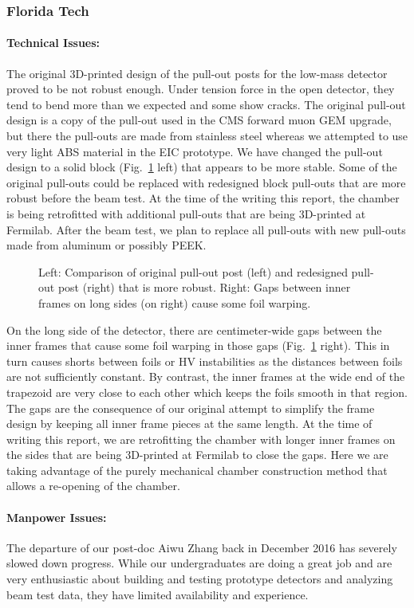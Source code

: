 \subsubsection{Florida Tech} 

\paragraph*{Technical Issues:} The original 3D-printed design of the pull-out posts for the low-mass detector proved to be not robust enough. Under tension force in the open detector, they tend to bend more than we expected and some show cracks. The original pull-out design is a copy of the pull-out used in the CMS forward muon GEM upgrade, but there the pull-outs are made from stainless steel whereas we attempted to use very light ABS material in the EIC prototype. We have changed the pull-out design to a solid block (Fig.~\ref{fig:Pullouts} left) that appears to be more stable. Some of the original pull-outs could be replaced with redesigned block pull-outs that are more robust before the beam test. At the time of the writing this report, the chamber is being retrofitted with additional pull-outs that are being 3D-printed at Fermilab. After the beam test, we plan to replace all pull-outs with new pull-outs made from aluminum or possibly PEEK.

\begin{figure}
	\centering
	\caption{\label{fig:Pullouts}Left: Comparison of original pull-out post (left) and redesigned pull-out post (right) that is more robust. Right: Gaps between inner frames on long sides (on right) cause some foil warping.}	
\end{figure}

On the long side of the detector, there are centimeter-wide gaps between the inner frames that cause some foil warping in those gaps (Fig.~\ref{fig:Pullouts} right). This in turn causes shorts between foils or HV instabilities as the distances between foils are not sufficiently constant. By contrast, the inner frames at the wide end of the trapezoid are very close to each other which keeps the foils smooth in that region. The gaps are the consequence of our original attempt to simplify the frame design by keeping all inner frame pieces at the same length. At the time of writing this report, we are retrofitting the chamber with longer inner frames on the sides that are being 3D-printed at Fermilab to close the gaps. Here we are taking advantage of the purely mechanical chamber construction method that allows a re-opening of the chamber.

\paragraph*{Manpower Issues:} The departure of our post-doc Aiwu Zhang back in December 2016 has severely slowed down progress. While our undergraduates are doing a great job and are very enthusiastic about building and testing prototype detectors and analyzing beam test data, they have limited availability and experience.
